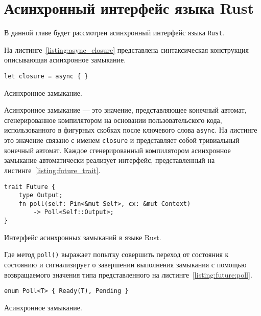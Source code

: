 \section{Асинхронный интерфейс языка Rust}

В данной главе будет рассмотрен асинхронный интерфейс языка \verb|Rust|.

На листинге~\ref{listing:async_closure} представлена синтаксическая конструкция описывающая асинхронное замыкание.

\begin{listing}[H]
    \begin{verbatim}
let closure = async { }
    \end{verbatim}

    \caption{Асинхронное замыкание.}
    \label{listing:async_closure}
\end{listing}

Асинхронное замыкание --- это значение, представляющее конечный автомат, сгенерированное компилятором на основании пользовательского кода, использованного в фигурных скобках после ключевого слова \verb|async|. На листинге это значение связано с именем \verb|closure| и представляет собой тривиальный конечный автомат. Каждое сгенерированный компилятором асинхронное замыкание автоматически реализует интерфейс, представленный на листинге~\ref{listing:future_trait}.

\begin{listing}[H]
    \begin{verbatim}
trait Future {
    type Output;
    fn poll(self: Pin<&mut Self>, cx: &mut Context)
        -> Poll<Self::Output>;
}
    \end{verbatim}

    \caption{Интерфейс асинхронных замыканий в языке Rust.}
    \label{listing:future_trait}
\end{listing}

Где метод \verb|poll()| выражает попытку совершить переход от состояния к состоянию и сигнализирует о завершении выполнения замыкания с помощью возвращаемого значения типа представленного на листинге~\ref{listing:future:poll}.

\begin{listing}[H]
    \begin{verbatim}
enum Poll<T> { Ready(T), Pending }
    \end{verbatim}

    \caption{Асинхронное замыкание.}
    \label{listing:future:poll}
\end{listing}

